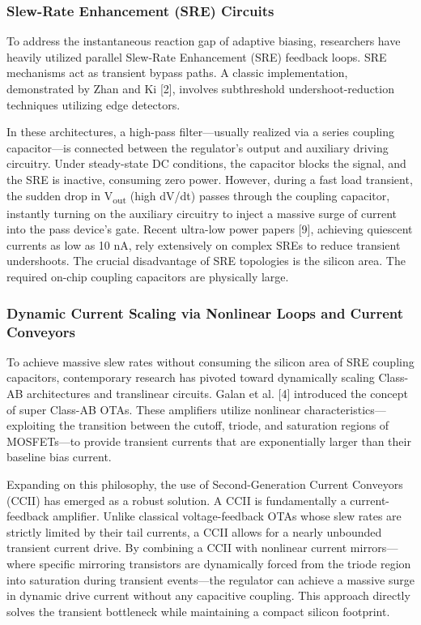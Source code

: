 \documentclass[
]{article}
\begin{document}
\subsubsection{Slew-Rate Enhancement (SRE)
Circuits}\label{_slew_rate_enhancement_sre_circuits}

To address the instantaneous reaction gap of adaptive biasing,
researchers have heavily utilized parallel Slew-Rate Enhancement (SRE)
feedback loops. SRE mechanisms act as transient bypass paths. A classic
implementation, demonstrated by Zhan and Ki {[}2{]}, involves
subthreshold undershoot-reduction techniques utilizing edge detectors.

In these architectures, a high-pass filter---usually realized via a
series coupling capacitor---is connected between the regulator's output
and auxiliary driving circuitry. Under steady-state DC conditions, the
capacitor blocks the signal, and the SRE is inactive, consuming zero
power. However, during a fast load transient, the sudden drop in
V\textsubscript{out} (high dV/dt) passes through the coupling capacitor,
instantly turning on the auxiliary circuitry to inject a massive surge
of current into the pass device's gate. Recent ultra-low power papers
{[}9{]}, achieving quiescent currents as low as 10 nA, rely extensively
on complex SREs to reduce transient undershoots. The crucial
disadvantage of SRE topologies is the silicon area. The required on-chip
coupling capacitors are physically large.

\subsubsection{Dynamic Current Scaling via Nonlinear Loops and Current
Conveyors}\label{_dynamic_current_scaling_via_nonlinear_loops_and_current_conveyors}

To achieve massive slew rates without consuming the silicon area of SRE
coupling capacitors, contemporary research has pivoted toward
dynamically scaling Class-AB architectures and translinear circuits.
Galan et al. {[}4{]} introduced the concept of super Class-AB
OTAs. These amplifiers utilize nonlinear characteristics---exploiting the
transition between the cutoff, triode, and saturation regions of MOSFETs---to provide transient
currents that are exponentially larger than their baseline bias current.

Expanding on this philosophy, the use of Second-Generation Current
Conveyors (CCII) has emerged as a robust solution. A CCII is
fundamentally a current-feedback amplifier. Unlike classical
voltage-feedback OTAs whose slew rates are strictly limited by their
tail currents, a CCII allows for a nearly unbounded transient current
drive. By combining a CCII with nonlinear current mirrors---where
specific mirroring transistors are dynamically forced from the triode
region into saturation during transient events---the regulator can
achieve a massive surge in dynamic drive current without any capacitive
coupling. This approach directly solves the transient bottleneck while
maintaining a compact silicon footprint.
\end{document}
